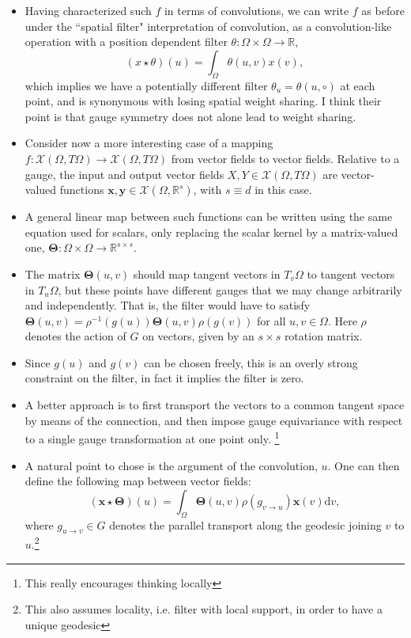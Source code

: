 \documentclass[12pt]{article}
\numberwithin{equation}{section}
\theoremstyle{definition}
\newcommand{		\R		}	{	\mathbb{R}				}
\newcommand{		\cX		}	{	\mathcal{X}				}
\newcommand{		\Oh		}	{	\Omega					}
\newcommand{		\1		}	{	\bm{1}					}%
\begin{document}
\begin{itemize}
\item Having characterized such $f$ in terms of convolutions, we can write $f$ as before under the ``spatial filter" interpretation of convolution, as a convolution-like operation with a position dependent filter $\theta : \Oh \times \Oh \to \R$,
$$
(x \star \theta) (u) = \int_\Oh \theta(u,v) x(v),
$$
which implies we have a potentially different filter $\theta_u = \theta(u , \circ)$ at each point, and is synonymous with losing spatial weight sharing. I think their point is that gauge symmetry does not alone lead to weight sharing. 

\item Consider now a more interesting case of a mapping $f : \cX(\Oh,T\Oh) \to \cX ( \Oh, T\Oh)$ from vector fields to vector fields. Relative to a gauge, the input and output vector fields $X,Y \in \cX ( \Oh, T\Oh)$ are vector-valued functions $\mathbf{x}, \mathbf{y} \in \cX(\Oh,\R^s)$, with $s \equiv d$ in this case. 

\item A general linear map between such functions can be written using the same equation used for scalars, only replacing the scalar kernel by a matrix-valued one, $\mathbf{\Theta} :\Oh \times \Oh \to \R^{s \times s}$. 

\item The matrix $\mathbf{\Theta} (u,v) $ should map tangent vectors in $T_v \Oh$ to tangent vectors in $T_u \Oh$, but these points have different gauges that we may change arbitrarily and independently. That is, the filter would have to satisfy $\mathbf{\Theta}(u,v) = \rho^{-1} ( g(u)) \mathbf{\Theta}(u,v) \rho( g(v))$ for all $u,v \in \Oh$. Here $\rho$ denotes the action of $G$ on vectors, given by an $s \times s$ rotation matrix. 


\item Since $g(u)$ and $g(v)$ can be chosen freely, this is an overly strong constraint on the filter, in fact it implies the filter is zero. 

\item A better approach is to first transport the vectors to a common tangent space by means of the connection, and then impose gauge equivariance with respect to a single gauge transformation at one point only. \footnote{This really encourages thinking locally} 

\item A natural point to chose is the argument of the convolution, $u$. One can then define the following map between vector fields:
$$
( \mathbf{x} \star \mathbf{\Theta} ) (u ) = \int_{\Oh} \mathbf{\Theta} (u,v) \rho( g_{v \to u} ) \mathbf{x}(v) \textrm{d} v,
$$
where $g_{u \to v } \in G$ denotes the parallel transport along the geodesic joining $v$ to $u$.\footnote{This also assumes locality, i.e. filter with local support, in order to have a unique geodesic} 


\end{itemize}
\end{document}
